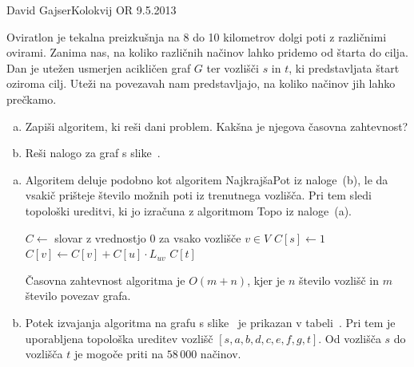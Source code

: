 \begin{naloga}{David Gajser}{Kolokvij OR 9.5.2013}
\begin{vprasanje}
Oviratlon je tekalna preizkušnja
na 8 do 10 kilometrov dolgi poti z različnimi ovirami.
Zanima nas, na koliko različnih načinov lahko pridemo od štarta do cilja.
Dan je utežen usmerjen acikličen graf $G$ ter vozlišči $s$ in $t$,
ki predstavljata štart oziroma cilj.
Uteži na povezavah nam predstavljajo,
na koliko načinov jih lahko prečkamo.

\begin{enumerate}[(a)]
\item Zapiši algoritem, ki reši dani problem.
Kakšna je njegova časovna zahtevnost?

\item Reši nalogo za graf s slike~\fig.
\end{enumerate}

\begin{slika}
\pgfslika
{}
\end{slika}
\end{vprasanje}

\begin{odgovor}
\begin{enumerate}[(a)]
\item Algoritem deluje podobno kot algoritem {\sc NajkrajšaPot}
iz naloge~\res[topo]{}(b),
le da vsakič prišteje število možnih poti iz trenutnega vozlišča.
Pri tem sledi topološki ureditvi,
ki jo izračuna z algoritmom {\sc Topo} iz naloge~\res[topo]{}(a).
\begin{small}
\begin{algorithmic}
\State $C \gets$ slovar z vrednostjo $0$ za vsako vozlišče $v \in V$
\State $C[s] \gets 1$
        \State $C[v] \gets C[v] + C[u] \cdot L_{uv}$
    \EndFor
\EndFor
\State \Return $C[t]$
\EndFunction
\end{algorithmic}
\end{small}
Časovna zahtevnost algoritma je $O(m + n)$,
kjer je $n$ število vozlišč in $m$ število povezav grafa.

\item Potek izvajanja algoritma na grafu s slike~\fig
je prikazan v tabeli~\tab.
Pri tem je uporabljena topološka ureditev vozlišč
$[s, a, b, d, c, e, f, g, t]$.
Od vozlišča $s$ do vozlišča $t$ je mogoče priti na $58\,000$ načinov.
\end{enumerate}


\end{odgovor}
\end{naloga}
